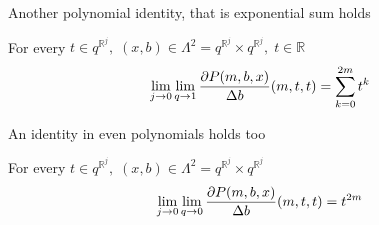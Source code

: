 Another polynomial identity, that is exponential sum holds
\begin{cor}
    \label{time_scale_pure_quantum_power_corollary_1}
    For every $t\in q^{\mathbb{R}^j}, \; (x,b) \in\Lambda^2 = q^{\mathbb{R}^j} \times q^{\mathbb{R}^j}, \; t\in\mathbb{R}$
    \begin{align*}
        \lim \limits_{j \to 0} \lim \limits_{q \to 1} \frac{\partial P ( m, b, x )}{\Delta b} (m, t, t)
        = \sum_{k=0}^{2m} t^k
    \end{align*}
\end{cor}

An identity in even polynomials holds too
\begin{cor}
    \label{time_scale_pure_quantum_power_corollary_2}
    For every $t\in q^{\mathbb{R}^j}, \; (x,b) \in\Lambda^2 = q^{\mathbb{R}^j} \times q^{\mathbb{R}^j}$
    \begin{align*}
        \lim \limits_{j \to 0} \lim \limits_{q \to 0} \frac{\partial P ( m, b, x )}{\Delta b} (m, t, t)
        = t^{2m}
    \end{align*}
\end{cor}

